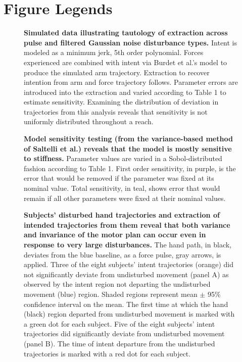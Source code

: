 \pagebreak

\section*{Figure Legends}
%
\begin{figure}
\caption{
{\bf Simulated data illustrating tautology of extraction across pulse and filtered Gaussian noise disturbance types.} Intent is modeled as a minimum jerk, 5th order polynomial. Forces experienced are combined with intent via Burdet et al.'s \cite{burdet2006stability} model to produce the simulated arm trajectory. Extraction to recover intention from arm and force trajectory follows. Parameter errors are introduced into the extraction and varied according to Table 1 to estimate sensitivity. Examining the distribution of deviation in trajectories from this analysis reveals that sensitivity is not uniformly distributed throughout a reach.
}
\label{fig:synthetic}
\end{figure}

\begin{figure}[!]
\caption{
{\bf Model sensitivity testing (from the variance-based method of Saltelli et al.\cite{saltelli2010variance}) reveals that the model is mostly sensitive to stiffness.} Parameter values are varied in a Sobol-distributed fashion according to Table 1. First order sensitivity, in purple, is the error that would be removed if the parameter was fixed at its nominal value. Total sensitivity, in teal, shows error that would remain if all other parameters were fixed at their nominal values.
}
\label{fig:sensitivity}
\end{figure}

\begin{figure}[!]
\caption{
{\bf Subjects' disturbed hand trajectories and extraction of intended trajectories from them reveal that both variance and invariance of the motor plan can occur even in response to very large disturbances.} The hand path, in black, deviates from the blue baseline, as a force pulse, gray arrows, is applied. Three of the eight subjects' intent trajectories (orange) did not significantly deviate from undisturbed movement (panel A) as observed by the intent region not departing the undisturbed movement (blue) region. Shaded regions represent mean $\pm$ 95\% confidence interval on the mean. The first time at which the hand (black) region departed from undisturbed movement is marked with a green dot for each subject. Five of the eight subjects' intent trajectories did significantly deviate from undisturbed movement (panel B). The time of intent departure from the undisturbed trajectories is marked with a red dot for each subject.
}
\label{fig:anecdotes}
\end{figure}
\pagebreak

